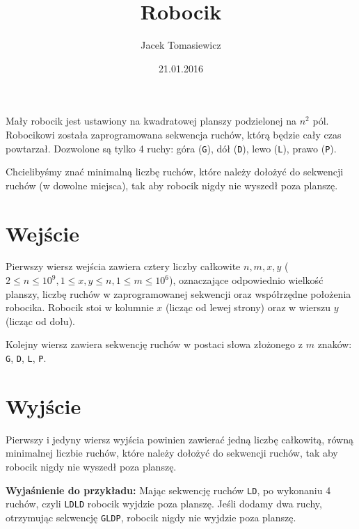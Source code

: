 \documentclass[zad,zawodnik,utf8]{sinol}
\title{Robocik}
\author{Jacek Tomasiewicz} %
\date{21.01.2016}
\begin{document}
  \begin{tasktext}%
Mały robocik jest ustawiony na kwadratowej planszy podzielonej na  $n^2$ pól. Robocikowi została zaprogramowana sekwencja ruchów, którą  będzie cały czas powtarzał. Dozwolone są tylko 4 ruchy: góra  (\texttt{G}), dół (\texttt{D}), lewo (\texttt{L}), prawo (\texttt {P}).

Chcielibyśmy znać minimalną liczbę ruchów, które należy dołożyć do  sekwencji ruchów (w dowolne miejsca), tak aby robocik nigdy nie  wyszedł poza planszę. 
 
  \section{Wejście}
Pierwszy wiersz wejścia zawiera cztery liczby całkowite $n, m, x, y$  ($2 \leq n \leq 10^9, 1 \leq x, y \leq n, 1 \leq m \leq 10^6$), oznaczające  odpowiednio wielkość planszy, liczbę ruchów w zaprogramowanej sekwencji oraz współrzędne położenia robocika. Robocik stoi w kolumnie $x$ (licząc od lewej strony) oraz w wierszu $y$ (licząc od dołu).

Kolejny wiersz zawiera sekwencję ruchów w postaci słowa złożonego z  $m$ znaków: \texttt{G}, \texttt{D}, \texttt{L}, \texttt{P}.

  \section{Wyjście}
Pierwszy i jedyny wiersz wyjścia powinien zawierać jedną liczbę  całkowitą, równą minimalnej liczbie ruchów, które należy dołożyć do  sekwencji ruchów, tak aby robocik nigdy nie wyszedł poza planszę.

     \makestandardexample

\bigskip
\noindent
\textbf{Wyjaśnienie do przykładu:} 
Mając sekwencję ruchów \texttt{LD}, po wykonaniu 4 ruchów, czyli  \texttt{LDLD} robocik wyjdzie poza planszę. Jeśli dodamy dwa ruchy,  otrzymując sekwencję \texttt{GLDP}, robocik nigdy nie wyjdzie poza  planszę.

  \end{tasktext}
\end{document}
